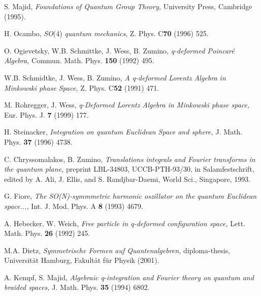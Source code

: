 \documentclass[a4paper,11pt,oneside]{article}
\begin{document}
\begin{thebibliography}{99}
  S. Majid, \textit{Foundations of Quantum Group Theory, }%
University Press, Cambridge (1995).

  H. Ocambo, \textit{SO}\coordHE{}(4) \textit{quantum mechanics},
Z. Phys. C\textbf{70} (1996) 525.

  O. Ogievetsky, W.B. Schmittke, J. Wess, B. Zumino, \textit{%
q-deformed Poincar\'{e} Algebra,} Commun. Math. Phys. \textbf{150} (1992) 495.

  W.B. Schmidtke, J. Wess, B. Zumino, \textit{A q-deformed
Lorentz Algebra in Minkowski phase Space, }Z. Phys.  C\textbf{52 }(1991) 471.

  M. Rohregger, J. Wess, \textit{q-Deformed Lorentz Algebra in
Minkowski phase space, }Eur. Phys. J. \textbf{7} (1999) 177.

  H. Steinacker, \textit{Integration on quantum Euclidean
Space and sphere,} J. Math. Phys. \textbf{37} (1996) 4738.

  C. Chryssomalakos, B. Zumino, \textit{Translations integrals
and Fourier transforms in the quantum plane, }preprint LBL-34803,
UCCB-PTH-93/30, in Salamfestschrift, edited by A. Ali, J. Ellis, and S.
Randjbar-Daemi, World Sci., Singapore, 1993.

  G. Fiore, \textit{The SO}\coordHE{}\textit{(N)-symmmetric
harmonic oszillator on the quantum Euclidean space...,} Int. J. Mod. Phys. A%
\textbf{8} (1993) 4679.

  A. Hebecker, W. Weich, \textit{Free particle in q-deformed
configuration space, }Lett. Math. Phys. \textbf{26} (1992) 245.

  M.A. Dietz, \textit{Symmetrische Formen auf
Quantenalgebren, }diploma-thesis, Universit\"{a}t Hamburg, Fakult\"{a}t
f\"{u}r Physik (2001).

  A. Kempf, S. Majid, \textit{Algebraic q-integration and
Fourier theory on quantum and braided spaces, }J. Math. Phys. \textbf{35}
(1994) 6802.
\end{thebibliography}
\end{document}
